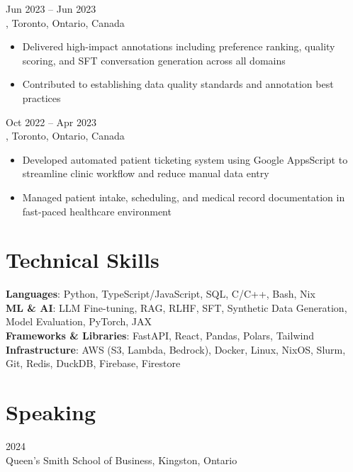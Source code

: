 \documentclass[letterpaper,10pt]{article}
\begin{document}
\hspace{0.15in}{\large\bfseries Data Quality Specialist} \hfill {\small Jun 2023 -- Jun 2023} \\
\hspace{0.15in}{\bfseries Cohere}, Toronto, Ontario, Canada
\vspace{-1pt}
\begin{itemize}[leftmargin=0.35in, itemsep=-1pt, topsep=1pt, labelsep=0.035in]
\item Delivered high-impact annotations including preference ranking, quality scoring, and SFT conversation generation across all domains
\item Contributed to establishing data quality standards and annotation best practices
\end{itemize}
\vspace{1pt}

\hspace{0.15in}{\large\bfseries Medical Assistant} \hfill {\small Oct 2022 -- Apr 2023} \\
\hspace{0.15in}{\bfseries P\&A Medical}, Toronto, Ontario, Canada
\vspace{-1pt}
\begin{itemize}[leftmargin=0.35in, itemsep=-1pt, topsep=1pt, labelsep=0.035in]
\item Developed automated patient ticketing system using Google AppsScript to streamline clinic workflow and reduce manual data entry
\item Managed patient intake, scheduling, and medical record documentation in fast-paced healthcare environment
\end{itemize}

\section{Technical Skills}

\hspace{0.15in}\textbf{Languages}: Python, TypeScript/JavaScript, SQL, C/C++, Bash, Nix \\
\hspace{0.15in}\textbf{ML \& AI}: LLM Fine-tuning, RAG, RLHF, SFT, Synthetic Data Generation, Model Evaluation, PyTorch, JAX \\
\hspace{0.15in}\textbf{Frameworks \& Libraries}: FastAPI, React, Pandas, Polars, Tailwind \\
\hspace{0.15in}\textbf{Infrastructure}: AWS (S3, Lambda, Bedrock), Docker, Linux, NixOS, Slurm, Git, Redis, DuckDB, Firebase, Firestore

\section{Speaking}

\hspace{0.15in}{\bfseries Guest Lecturer on AI and Synthetic Data Generation for MMA Program} \hfill {\small 2024} \\
\hspace{0.15in}Queen's Smith School of Business, Kingston, Ontario
\end{document}
